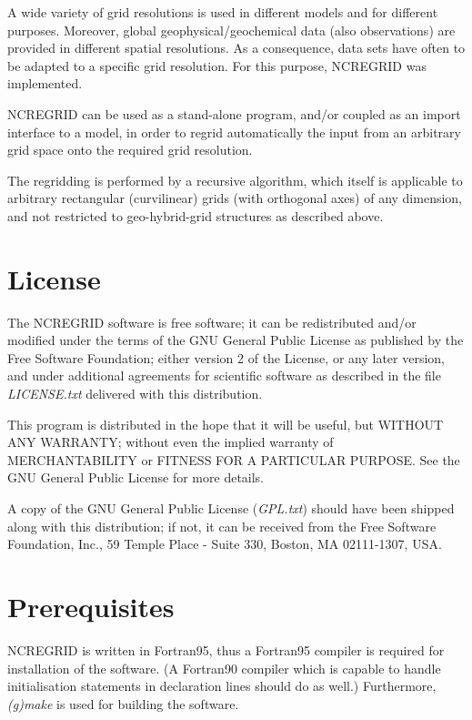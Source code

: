 \documentclass[12pt, a4paper]{article}
\begin{document}
A wide variety of grid resolutions is used in different models
and for different purposes. Moreover, global geophysical/geochemical data
(also observations) are provided in different spatial resolutions.
As a consequence, data sets have often to be adapted to a specific
grid resolution.
For this purpose, NCREGRID was implemented.

NCREGRID can be used as a stand-alone program, and/or coupled as an import
interface to a model, in order to regrid automatically the input from an
arbitrary grid space onto the required grid resolution. 

The regridding is performed by a recursive algorithm, which itself is
applicable to arbitrary rectangular (curvilinear) grids (with orthogonal axes)
of any dimension,
and not restricted to geo-hybrid-grid structures as described above.


\section{License}
\label{sec:license}
The NCREGRID software is free software; it can be redistributed and/or
modified under the terms of the GNU General Public License
as published by the Free Software Foundation; either version 2
of the License, or any later version,
and under additional agreements for scientific software
as described in the file {\it LICENSE.txt} delivered with this distribution.

This program is distributed in the hope that it will be useful,
but WITHOUT ANY WARRANTY; without even the implied warranty of
MER\-CHAN\-TA\-BI\-LI\-TY or FITNESS FOR A PARTICULAR PURPOSE.  See the
GNU General Public License for more details.

A copy of the GNU General Public License ({\it GPL.txt}) should have
been shipped
along with this distribution; if not, it can be received from the Free Software
Foundation, Inc., 59 Temple Place - Suite 330, Boston, MA  02111-1307, USA.


\section{Prerequisites}
\label{sec:prerequisites}
NCREGRID is written in Fortran95, thus a Fortran95 compiler
is required for installation of the software.
(A Fortran90 compiler which is capable to handle initialisation
statements in declaration lines should do as well.)
%
Furthermore, {\it (g)make} is used for building the software.
\end{document}
